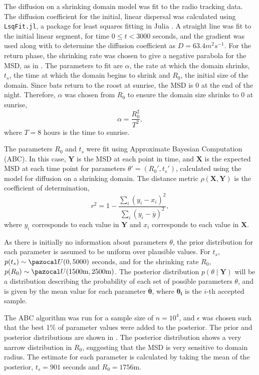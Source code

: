 The diffusion on a shrinking domain model was fit to the radio tracking data. The diffusion coefficient for the initial, linear dispersal was calculated using
\texttt{LsqFit.jl}, a package for least squares fitting in Julia \cite{LsqFit}. A
straight line was fit to the initial linear segment, for time $0 \leq t < 3000$ seconds, and the gradient was used
along with  to determine the diffusion coefficient as $D
= 63.4 m^2s^{-1}$. For the return phase, the shrinking rate was chosen to give a negative parabola for the MSD, as in . The parameters to fit are $\alpha$, the rate at which the domain shrinks,
$t_s$, the time at which the domain begins to shrink and $R_0$, the initial size
of the domain. Since bats return to the roost at sunrise, the MSD is 0 at the end of the night. Therefore, $\alpha$ was chosen from $R_0$ to ensure the domain size shrinks to 0 at sunrise,
%
\begin{equation}
\alpha = \frac{R_0^2}{T^2},
\end{equation}
%
where $T = 8 $ hours is the time to sunrise.

 The parameters $R_0$ and $t_s$ were fit using Approximate Bayesian Computation (ABC). In this case, $\bm{Y}$ is the MSD at each point in time, and $\bm{X}$ is the expected MSD at each time
point for parameters $\theta' = (R_0',t_s') $, calculated using the model for
diffusion on a shrinking domain. The distance metric $\rho(\bm{X},\bm{Y})$ is the coefficient of determination,
%
\begin{equation}
r^2 = 1 - \frac{\sum_i(y_i - x_i)^2 }{\sum_i (y_i - \overline{y})^2},
\end{equation}
%
where $y_i$ corresponds to each value in $\bm{Y}$ and $x_i$ corresponds to each value in $\bm{X}$.

As there is initially no information about parameters $\theta$, the prior distribution for each parameter is assumed to be uniform over plausible values. For $t_s$, $p(t_s) \sim \unif(0,5000)$ seconds, and for the shrinking rate $R_0$, $p(R_0) \sim \unif(1500\mathrm{m},2500\mathrm{m})$. The posterior distribution $ p(\theta \mid \bm{Y})$ will be a distribution describing the probability of each set of possible parameters $\theta$, and is given by the mean value for each parameter $\overline{\bm{\theta}}$, where $\bm{\theta_i}$ is the $i$-th accepted sample.

The ABC algorithm was run for a sample size of $n = 10^4$, and $\epsilon$ was chosen such that the best 1\% of parameter values were added to the posterior. The prior and posterior distributions are shown in . The posterior distribution shows a very narrow distribution in $R_0$, suggesting that the MSD is very sensitive to domain radius. The estimate for each parameter is calculated by taking the mean of the posterior, $t_s = 901$ seconds and $R_0 = 1756$m.

